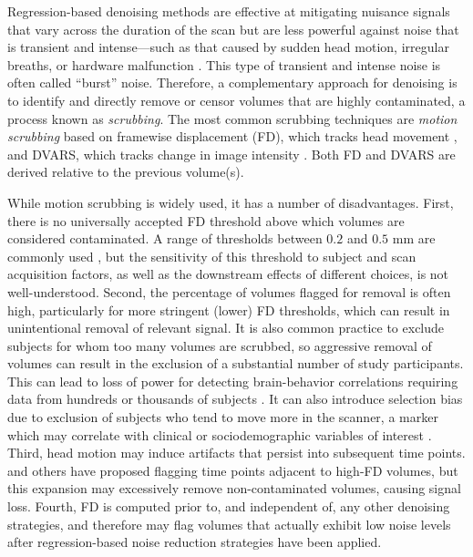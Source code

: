 \documentclass{article}
\begin{document}
Regression-based denoising methods are effective at mitigating nuisance signals that vary across the duration of the scan but are less powerful against noise that is transient and intense---such as that caused by sudden head motion, irregular breaths, or hardware malfunction \citep{powerSpuriousSystematicCorrelations2012,yanComprehensiveAssessmentRegional2013,parkesEvaluationEfficacyReliability2018,satterthwaiteMotionArtifactStudies2019}. This type of transient and intense noise is often called ``burst'' noise. Therefore, a complementary approach for denoising is to identify and directly remove or censor volumes that are highly contaminated, a process known as \textit{scrubbing}. The most common scrubbing techniques are \textit{motion scrubbing} based on framewise displacement (FD), which tracks head movement \citep{powerSpuriousSystematicCorrelations2012,powerMethodsDetectCharacterize2014},  and {DVARS}, which tracks change in image intensity \citep{smyserLongitudinalAnalysisNeural2010,powerSpuriousSystematicCorrelations2012}. Both FD and DVARS are derived relative to the previous volume(s).

While motion scrubbing is widely used, it has a number of disadvantages. First, there is no universally accepted FD threshold above which volumes are considered contaminated.  A range of thresholds between $0.2$ and $0.5$ mm are commonly used \citep{powerMethodsDetectCharacterize2014, ciricBenchmarkingParticipantlevelConfound2017, afyouniInsightInferenceDVARS2018}, but the sensitivity of this threshold to subject and scan acquisition factors, as well as the downstream effects of different choices, is not well-understood. Second, the percentage of volumes flagged for removal is often high, particularly for more stringent (lower) FD thresholds, which can result in %
unintentional removal of relevant signal. It is also common practice to exclude subjects for whom too many volumes are scrubbed, so aggressive removal of volumes can result in the exclusion of a substantial number of study participants. This can lead to loss of power for detecting brain-behavior correlations requiring data from hundreds or thousands of subjects \citep{Marek2022}. It can also introduce selection bias due to exclusion of subjects who tend to move more in the scanner, a marker which may correlate with clinical or sociodemographic variables of interest \citep{nebel2022accounting, cosgrove2022limits}.  Third, head motion may induce artifacts that persist into subsequent time points. \cite{powerSpuriousSystematicCorrelations2012} and others have proposed flagging time points adjacent to high-FD volumes, but this expansion may excessively remove non-contaminated volumes, causing signal loss. Fourth, FD is computed prior to, and independent of, any other denoising strategies, and therefore may flag volumes that actually exhibit low noise levels after regression-based noise reduction strategies have been applied. 
\end{document}
